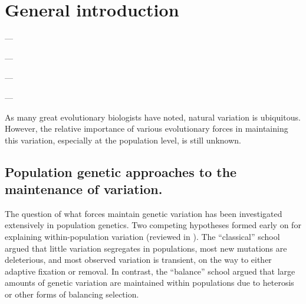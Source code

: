 \setlength{\parindent}{0ex}
\setlength{\parskip}{2ex}

\chapter{General introduction}

\begin{flushright}
--- \citet{darwin1859}
\end{flushright}

\begin{flushright}
--- \citet{haldane1932}
\end{flushright}

\begin{flushright}
--- \citet{dob1937}
\end{flushright}

\begin{flushright}
--- \citet{Lewontin1966-kz}
\end{flushright}

As many great evolutionary biologists have noted, natural variation is ubiquitous. However, the relative importance of various evolutionary forces in maintaining this variation, especially at the population level, is still unknown. 

\section{Population genetic approaches to the maintenance of variation.}

The question of what forces maintain genetic variation has been investigated extensively in population genetics. Two competing hypotheses formed early on for explaining within-population variation (reviewed in \citet{lewontin1974}). The “classical” school argued that little variation segregates in populations, most new mutations are deleterious, and most observed variation is transient, on the way to either adaptive fixation or removal. In contrast, the “balance” school argued that large amounts of genetic variation are maintained within populations due to heterosis or other forms of balancing selection. 

